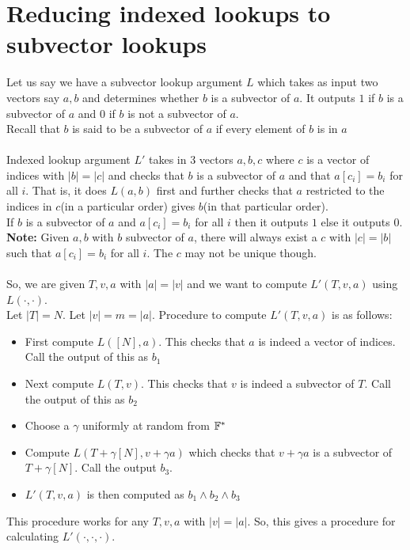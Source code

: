 \section{Reducing indexed lookups to subvector lookups}\label{sec:generic-transformation-app}
Let us say we have a subvector lookup argument $L$ which takes as input two vectors say $a, b$ and determines whether $b$ is a subvector of $a$. It outputs $1$ if $b$ is a subvector of $a$ and $0$ if $b$ is not a subvector of $a$. \\
Recall that $b$ is said to be a subvector of $a$ if every element of $b$ is in $a$\\\\


Indexed lookup argument $L'$ takes in 3 vectors $a, b, c$ where $c$ is a vector of indices with $|b|=|c|$ and checks that $b$ is a subvector of $a$ and that $a[c_i]=b_i$ for all $i$. That is, it does $L(a, b)$ first and further checks that $a$ restricted to the indices in $c$(in a particular order) gives $b$(in that particular order).\\
If $b$ is a subvector of $a$ and $a[c_i]=b_i$ for all $i$ then it outputs $1$ else it outputs $0$.\\

\textbf{Note:} Given $a,b$ with $b$ subvector of $a$, there will always exist a $c$ with $|c|=|b|$ such that $a[c_i]=b_i$ for all $i$. The $c$ may not be unique though. \\\\
So, we are given $T, v, a$ with $|a|=|v|$ and we want to compute $L'(T, v, a)$ using $L(\cdot, \cdot)$. \\
Let $|T|=N$. Let $|v|=m=|a|$.
Procedure to compute $L'(T, v, a)$ is as follows:
\begin{itemize}
    \item First compute $L([N], a)$. This checks that $a$ is indeed a vector of indices. Call the output of this as $b_1$
    \item Next compute $L(T, v)$. This checks that $v$ is indeed a subvector of $T$. Call the output of this as $b_2$
    \item Choose a $\gamma$ uniformly at random from $\mathbb{F}^*$
    \item Compute $L(T+\gamma[N], v+\gamma a)$ which checks that $v+\gamma a$ is a subvector of $T+\gamma [N]$. Call the output $b_3$.
    \item $L'(T, v, a)$ is then computed as $b_1 \wedge b_2 \wedge b_3$
\end{itemize}
This procedure works for any $T,v,a$ with $|v|=|a|$. So, this gives a procedure for calculating $L'(\cdot, \cdot, \cdot)$.

